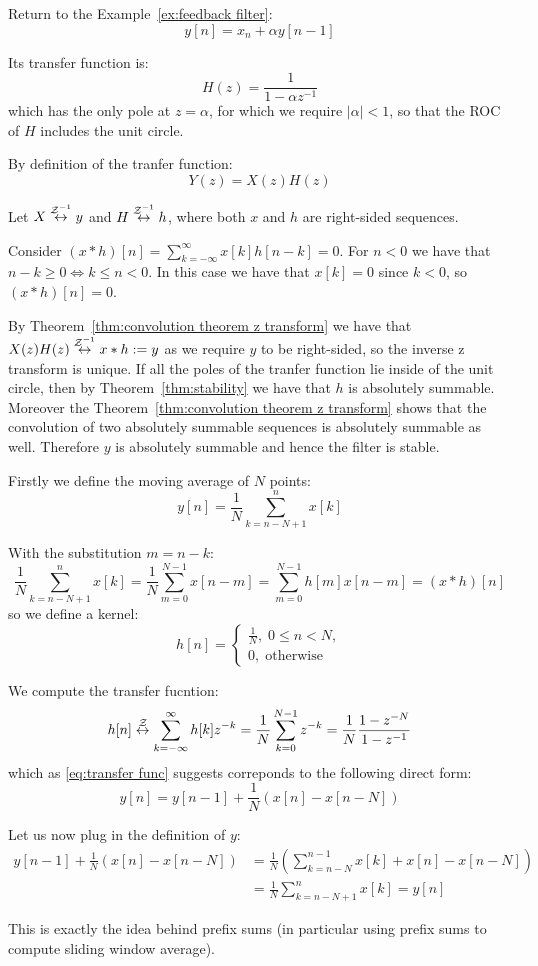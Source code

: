 Return to the Example~\ref{ex:feedback filter}:
\[y[n] = x_n + \alpha y[n-1]\]

Its transfer function is:
\[H(z) = \frac{1}{1 - \alpha z^{-1}}\]
which has the only pole at $z = \alpha$, for which we require $|\alpha|< 1$, so that the ROC of $H$ includes the unit circle.

By definition of the tranfer function:
\[Y(z) = X(z)H(z)\]

Let $X \overset{\mathcal{Z}^{-1}}{\leftrightarrow} y$ and $H \overset{\mathcal{Z}^{-1}}{\leftrightarrow} h$, where both $x$ and $h$ are right-sided sequences.

Consider $(x \ast h)[n] = \sum_{k = -\infty}^{\infty} x[k] h[n-k] = 0$. For $n<0$ we have that $n - k \geq 0 \Leftrightarrow k \leq n < 0$. In this case we have that $x[k] = 0$ since $k < 0$, so $(x \ast h)[n] = 0$.

By Theorem~\ref{thm:convolution theorem z transform} we have that $X(z)H(z) \overset{\mathcal{Z}^{-1}}{\leftrightarrow} x \ast h := y$ as we require $y$ to be right-sided, so the inverse z transform is unique. If all the poles of the tranfer function lie inside of the unit circle, then by Theorem~\ref{thm:stability} we have that $h$ is absolutely summable. Moreover the Theorem~\ref{thm:convolution theorem z transform} shows that the convolution of two absolutely summable sequences is absolutely summable as well. Therefore $y$ is absolutely summable and hence the filter is stable.

\begin{remark}
    Firstly we define the moving average of $N$ points:
    \[
        y[n]
        = \frac{1}{N} \sum_{k=n - N + 1}^{n} x[k]\]

    With the substitution $m = n - k$:
    \[
        \frac{1}{N} \sum_{k = n - N + 1}^{n} x[k]
        = \frac{1}{N} \sum_{m = 0}^{N-1} x[n-m]
        = \sum_{m = 0}^{N-1} h[m] x[n-m]
        = (x \ast h)[n]\]
    so we define a kernel:
    \[h[n] = \begin{cases}
            \frac{1}{N}, \; 0 \leq n < N, \\
            0, \; \text{otherwise}
        \end{cases}\]

    We compute the transfer fucntion:
    \[h[n]
        \overset{\mathcal{Z}}{\leftrightarrow} \sum_{k = -\infty}^{\infty} h[k] z^{-k}
        = \frac{1}{N} \sum_{k = 0}^{N-1} z^{-k}
        = \frac{1}{N} \frac{1-z^{-N}}{1-z^{-1}}\]
    which as \eqref{eq:transfer func} suggests correponds to the following direct form:
    \[y[n] = y[n-1] + \frac{1}{N} (x[n] - x[n-N])\]

    Let us now plug in the definition of $y$:
    \begin{align*}
        y[n-1] + \frac{1}{N} (x[n] - x[n-N])
         & = \frac{1}{N} \left(\sum_{k = n - N}^{n - 1} x[k] + x[n] - x[n-N]\right)
        \\ &= \frac{1}{N} \sum_{k = n - N + 1}^{n} x[k]
        = y[n]
    \end{align*}

    This is exactly the idea behind prefix sums (in particular using prefix sums to compute sliding window average).
\end{remark}

